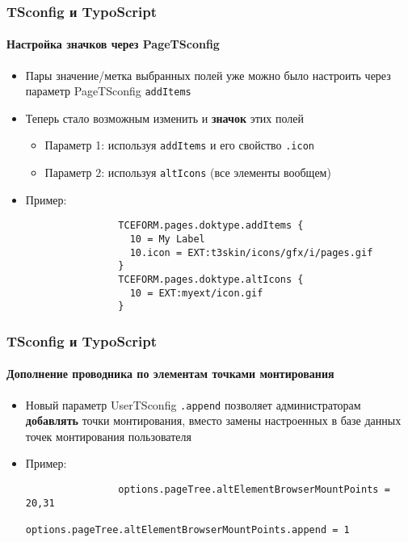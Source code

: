 \begin{frame}[fragile]
	\frametitle{TSconfig и TypoScript}
	\framesubtitle{Настройка значков через PageTSconfig}

	\begin{itemize}
		\item Пары значение/метка выбранных полей уже можно было настроить через параметр PageTSconfig \texttt{addItems}
		\item Теперь стало возможным изменить и \textbf{значок} этих полей

			\begin{itemize}
				\item Параметр 1: используя \texttt{addItems} и его свойство \texttt{.icon}
				\item Параметр 2: используя \texttt{altIcons} (все элементы вообщем)
			\end{itemize}

		\item Пример:

			\begin{lstlisting}
				TCEFORM.pages.doktype.addItems {
				  10 = My Label
				  10.icon = EXT:t3skin/icons/gfx/i/pages.gif
				}
				TCEFORM.pages.doktype.altIcons {
				  10 = EXT:myext/icon.gif
				}
			\end{lstlisting}

	\end{itemize}

\end{frame}


\begin{frame}[fragile]
	\frametitle{TSconfig и TypoScript}
	\framesubtitle{Дополнение проводника по элементам точками монтирования}

	\begin{itemize}
		\item Новый параметр UserTSconfig \texttt{.append} позволяет администраторам \textbf{добавлять}
			точки монтирования, вместо замены настроенных в базе данных точек монтирования пользователя 

		\item Пример:

			\begin{lstlisting}
				options.pageTree.altElementBrowserMountPoints = 20,31
				options.pageTree.altElementBrowserMountPoints.append = 1
			\end{lstlisting}

	\end{itemize}

\end{frame}

